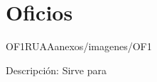 \section{Oficios}

\begin{Documento}{OF1}{RUAA}{anexos/imagenes/OF1}
	\item[Descripción:] Sirve para
	\begin{LCampos}
	\end{LCampos}
\end{Documento}


